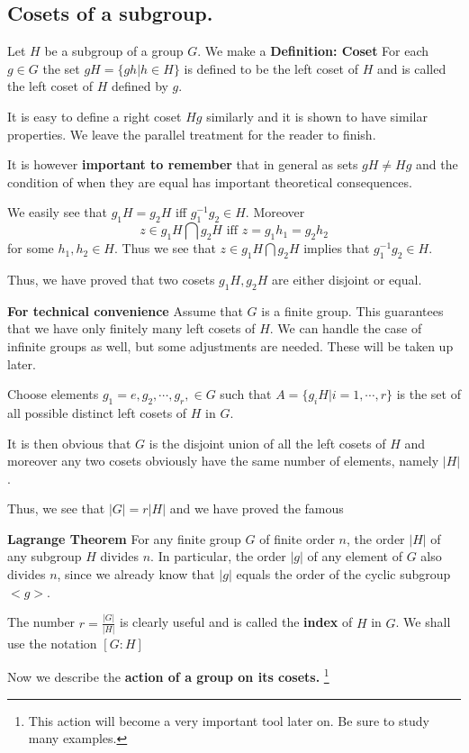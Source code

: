 \documentclass[12pt]{article}
\newcommand{\deff}[1]{{\bf Definition: #1} }
\begin{document}
\subsection{Cosets of a subgroup.}
Let $H$ be a subgroup of a group $G$. We make a
\deff{Coset}
For each $g\in G$ the set $gH = \{ gh | h\in H\}$ is defined to be
the left coset of $H$ and is called the left coset of $H$ defined by
$g$.


It is easy to define a right coset $Hg$ similarly and it is shown to
have similar properties. We leave the parallel treatment for the reader
to finish.

It is however {\bf important to remember} that in general as sets $gH \neq Hg$
and the condition of when they are equal has important theoretical
consequences.

We easily see that $g_1H=g_2H$ iff $g_1^{-1}g_2 \in H$.
Moreover
$$z\in g_1H\bigcap g_2H \mbox{ iff } z = g_1h_1=g_2h_2 $$
for some $h_1,h_2\in H$.
Thus we see that $z\in g_1H\bigcap g_2H$ implies that $g_1^{-1}g_2\in
H$.

Thus, we have proved that two cosets $g_1H,g_2H$ are either disjoint or
equal.

{\bf For technical convenience} Assume that $G$ is a finite group.
This guarantees that we have only finitely many left cosets of $H$.
We can handle the case of infinite groups as well, but some adjustments
are needed. These will be taken up later.

Choose elements $g_1=e,g_2,\cdots,g_r, \in G$ such that $A=\{g_iH |
i=1,\cdots,r \}$ is the set of all possible distinct left cosets of $H$ in $G$.

It is then obvious that $G$ is the disjoint union of all the left cosets
of $H$ and moreover any two cosets obviously have the same number of
elements, namely $|H|$.

Thus, we see that $|G|=r|H|$ and we have proved the famous

{\bf Lagrange Theorem }
For any finite group $G$ of finite order $n$, the order $|H|$ of any
subgroup $H$ divides $n$. In particular, the order $|g|$ of any
element of $G$ also divides $n$, since we already know that $|g|$ equals the order
of the cyclic subgroup $<g>$.

The number $r=\frac{|G|}{|H|}$ is clearly useful and is called the {\bf
index} of $H$ in $G$. We shall use the notation $[G:H]$

Now we describe the {\bf action of a group on its cosets.}
\footnote{This action will become a very important tool later on. Be
sure to study many examples.}
\end{document}
